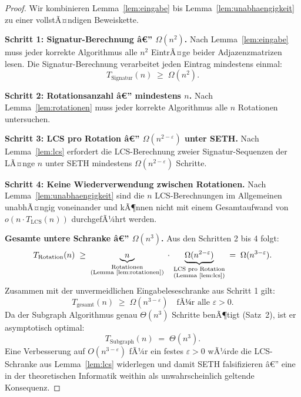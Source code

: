 ﻿\documentclass[a4paper,12pt]{article}
\theoremstyle{definition}
\begin{document}
\begin{proof}
Wir kombinieren Lemma~\ref{lem:eingabe} bis Lemma~\ref{lem:unabhaengigkeit} zu einer vollstÃ¤ndigen Beweiskette.

\textbf{Schritt 1: Signatur-Berechnung â€” $\Omega(n^2)$.}
Nach Lemma~\ref{lem:eingabe} muss jeder korrekte Algorithmus alle $n^2$ EintrÃ¤ge beider Adjazenzmatrizen lesen.
Die Signatur-Berechnung verarbeitet jeden Eintrag mindestens einmal:
\[
	T_{\text{Signatur}}(n) \;\geq\; \Omega(n^2).
\]

\textbf{Schritt 2: Rotationsanzahl â€” mindestens $n$.}
Nach Lemma~\ref{lem:rotationen} muss jeder korrekte Algorithmus alle $n$ Rotationen untersuchen.

\textbf{Schritt 3: LCS pro Rotation â€” $\Omega(n^{2-\varepsilon})$ unter SETH.}
Nach Lemma~\ref{lem:lcs} erfordert die LCS-Berechnung zweier Signatur-Sequenzen der LÃ¤nge $n$
unter SETH mindestens $\Omega(n^{2-\varepsilon})$ Schritte.

\textbf{Schritt 4: Keine Wiederverwendung zwischen Rotationen.}
Nach Lemma~\ref{lem:unabhaengigkeit} sind die $n$ LCS-Berechnungen im Allgemeinen
unabhÃ¤ngig voneinander und kÃ¶nnen nicht mit einem Gesamtaufwand von $o(n \cdot T_{\mathrm{LCS}}(n))$ durchgefÃ¼hrt werden.

\textbf{Gesamte untere Schranke â€” $\Omega(n^3)$.}
Aus den Schritten 2 bis 4 folgt:
\[
	T_{\text{Rotation}}(n)
	\;\geq\;
	\underbrace{n}_{\substack{\text{Rotationen}\\\text{(Lemma \ref{lem:rotationen})}}}
	\;\cdot\;
	\underbrace{\Omega(n^{2-\varepsilon})}_{\substack{\text{LCS pro Rotation}\\\text{(Lemma \ref{lem:lcs})}}}
	\;=\; \Omega(n^{3-\varepsilon}).
\]
Zusammen mit der unvermeidlichen Eingabeleseschranke aus Schritt 1 gilt:
\[
	T_{\text{gesamt}}(n) \;\geq\; \Omega(n^{3-\varepsilon}) \quad \text{fÃ¼r alle } \varepsilon > 0.
\]
Da der Subgraph Algorithmus genau $\Theta(n^3)$ Schritte benÃ¶tigt (Satz~2), ist er asymptotisch optimal:
\[
	T_{\text{Subgraph}}(n) \;=\; \Theta(n^3).
\]
Eine Verbesserung auf $O(n^{3-\varepsilon})$ fÃ¼r ein festes $\varepsilon > 0$ wÃ¼rde die LCS-Schranke aus Lemma~\ref{lem:lcs} widerlegen und damit SETH falsifizieren â€” eine in der theoretischen Informatik weithin als unwahrscheinlich geltende Konsequenz.
\end{proof}
\end{document}
